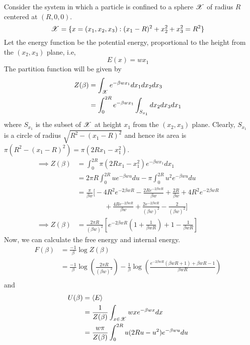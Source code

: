\documentclass[letterpaper,english,10pt]{article}
\begin{document}
\begin{exmp}[Sphere]
Consider the system in which a particle is confined to a sphere $\mathscr{X}$ of radius $R$ centered at $(R,0,0)$.
$$\mathscr{X} = \{ x = (x_1, x_2, x_3) : (x_1 - R)^2 + x_2^2 + x_3^2 = R^2 \}$$
Let the energy function be the potential energy, proportional to the height from the $(x_2, x_3)$ plane, i.e,
$$ E(x) = w x_1$$
The partition function will be given by
\begin{align}
Z(\beta) &= \int_{\mathscr{X}} e^{-\beta w x_1} dx_1 dx_2 dx_3 \nonumber \\
	&= \int_0^{2R} e^{-\beta w x_1} \int_{S_{x_1}} dx_2 dx_3 dx_1\nonumber
\end{align}
where $S_{x_1}$ is the subset of $\mathscr{X}$ at height $x_1$ from the $(x_2, x_3)$ plane. Clearly, $S_{x_1}$ is a circle of radius $\sqrt{R^2 - (x_1-R)^2}$ and hence its area is $ \pi (R^2 - (x_1-R)^2) = \pi(2Rx_1 - x_1^2)$.
\begin{align}
\implies Z(\beta) &= \int_0^{2R} \pi (2Rx_1 - x_1^2) e^{-\beta w x_1} dx_1 \nonumber \\
	&= 2 \pi R \int_0^{2R} u e^{-\beta wu} du - \pi \int_0^{2R} u^2 e^{-\beta wu} du \nonumber \\
	&= \frac{\pi}{\beta w} \bigg[ -4R^2 e^{-2 \beta wR} - \frac{2R e^{-2 \beta wR}}{\beta w} + \frac{2R}{\beta w} 
	+ 4R^2 e^{-2 \beta wR} \nonumber \\ 
	& \qquad \qquad + \frac{4R e^{-2 \beta wR}}{\beta w} + \frac{2e^{-2 \beta wR}}{(\beta w)^2} - \frac{2}{(\beta w)^2} 
	\bigg] \nonumber \\
\implies Z(\beta) &= \frac{2\pi R}{(\beta w)^2} \left[ e^{-2 \beta wR} \left( 1 + \frac{1}{\beta w R} \right) + 1 - \frac{1}{\beta wR} \right] \label{eq:6}
\end{align}
Now, we can calculate the free energy and internal energy.
\begin{align}
F(\beta) &= \frac{-1}{\beta} \log Z(\beta) \nonumber \\
	&= \frac{-1}{\beta} \log \left( \frac{2 \pi R}{(\beta w)^2} \right) - \frac{1}{\beta} \log \left( \frac{e^{-2 \beta wR}(\beta wR + 1) + \beta wR - 1}{\beta wR} \right) \nonumber \\
\end{align}
and
\begin{align}
U(\beta) &= \left\langle E \right\rangle \nonumber \\
	&= \frac{1}{Z(\beta)} \int_{x \in \sX} wx e^{- \beta wx} dx \nonumber \\
	&= \frac{w \pi}{Z(\beta)} \int_0^{2R} u(2Ru - u^2) e^{-\beta wu} du \nonumber \\

\end{align}
\end{exmp}
\end{document}
